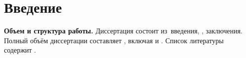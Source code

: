 \chapter*{Введение}                         %

\newcommand{\actuality}{{\textbf\actualityTXT}}
\newcommand{\progress}{{\textbf\progressTXT}}
\newcommand{\aim}{{\textbf\aimTXT}}
\newcommand{\tasks}{\textbf{\tasksTXT}}
\newcommand{\correspondence}{\textbf{\correspondenceTXT}}
\newcommand{\novelty}{\textbf{\noveltyTXT}}
\newcommand{\influence}{\textbf{\influenceTXT}}
\newcommand{\methods}{\textbf{\methodsTXT}}
\newcommand{\defpositions}{\textbf{\defpositionsTXT}}
\newcommand{\reliability}{\textbf{\reliabilityTXT}}
\newcommand{\probation}{\textbf{\probationTXT}}
\newcommand{\contribution}{\textbf{\contributionTXT}}
\newcommand{\publications}{\textbf{\publicationsTXT}}


\textbf{Объем и структура работы.} Диссертация состоит из~введения,
,
заключения.
%
Полный объём диссертации составляет
, включая
 и
.
Список литературы содержит
.



